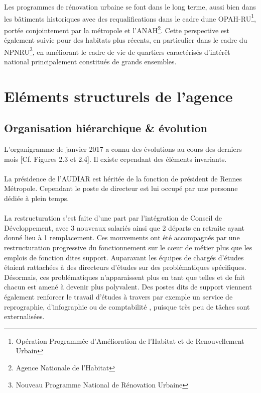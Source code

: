\documentclass{bredele}
\begin{document}
Les programmes de rénovation urbaine se font dans le long terme, aussi bien dans les bâtiments historiques avec des requalifications dans le cadre dune OPAH-RU\footnote{Opération Programmée d'Amélioration de l'Habitat et de Renouvellement Urbain}, portée conjointement par la métropole et l'ANAH\footnote{Agence Nationale de l'Habitat}. Cette perspective est également suivie pour des habitats plus récents, en particulier dans le cadre du NPNRU\footnote{Nouveau Programme National de Rénovation Urbaine}, en améliorant le cadre de vie de quartiers caractérisés d'intérêt national principalement constitués de grands ensembles.
\section{Eléments structurels de l'agence}
\subsection{Organisation hiérarchique & évolution}
L’organigramme de janvier 2017 a connu des évolutions au cours des derniers mois [Cf. Figures 2.3 et 2.4]. Il existe cependant des éléments invariants. 
\\\\La présidence de l’AUDIAR est héritée de la fonction de président de Rennes Métropole. Cependant le poste de directeur est lui occupé par une personne dédiée à plein temps. 
\\\\La restructuration s’est faite d’une part par l’intégration de Conseil de Développement, avec 3 nouveaux salariés ainsi que 2 départs en retraite ayant donné lieu à 1 remplacement. Ces mouvements ont été accompagnés par une restructuration progressive du fonctionnement sur le cœur de métier plus que les emplois de fonction dites support. Auparavant les équipes de chargés d’études étaient rattachées à des directeurs d’études sur des problématiques spécifiques. Désormais, ces problématiques n’apparaissent plus en tant que telles et de fait chacun est amené à devenir plus polyvalent. Des postes dits de support viennent également renforcer le travail d’études à travers par exemple un service de reprographie, d’infographie ou de comptabilité , puisque très peu de tâches sont externalisées.
\end{document}
